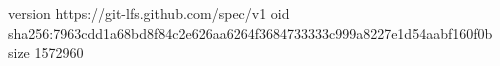 version https://git-lfs.github.com/spec/v1
oid sha256:7963cdd1a68bd8f84c2e626aa6264f3684733333c999a8227e1d54aabf160f0b
size 1572960
